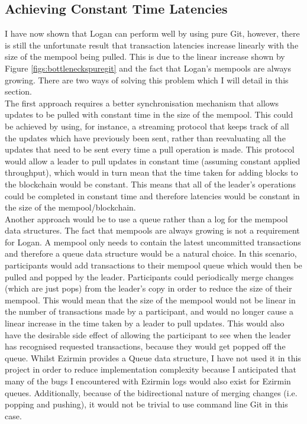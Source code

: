 \documentclass[12pt,a4paper,twoside,openright]{report}
\begin{document}
	\subsection{Achieving Constant Time Latencies}\label{sect:bettersync}
	I have now shown that Logan can perform well by using pure Git, however, there is still the unfortunate result that transaction latencies increase linearly with the size of the mempool being pulled.
	This is due to the linear increase shown by Figure \ref{figs:bottleneckspuregit} and the fact that Logan's mempools are always growing. 
	There are two ways of solving this problem which I will detail in this section.\\

	The first approach requires a better synchronisation mechanism that allows updates to be pulled with constant time in the size of the mempool.
	This could be achieved by using, for instance, a streaming protocol that keeps track of all the updates which have previously been sent, rather than reevaluating all the updates that need to be sent every time a pull operation is made. 
	This protocol would allow a leader to pull updates in constant time (assuming constant applied throughput), which would in turn mean that the time taken for adding blocks to the blockchain would be constant.
	This means that all of the leader's operations could be completed in constant time and therefore latencies would be constant in the size of the mempool/blockchain. \\

	Another approach would be to use a queue rather than a log for the mempool data structures. 
	The fact that mempools are always growing is not a requirement for Logan.
	A mempool only needs to contain the latest uncommitted transactions and therefore a queue data structure would be a natural choice.
	In this scenario, participants would add transactions to their mempool queue which would then be pulled and popped by the leader.
	Participants could periodically merge changes (which are just pops) from the leader's copy in order to reduce the size of their mempool.
	This would mean that the size of the mempool would not be linear in the number of transactions made by a participant, and would no longer cause a linear increase in the time taken by a leader to pull updates.
	This would also have the desirable side effect of allowing the participant to see when the leader has recognised requested transactions, because they would get popped off the queue. 
	Whilst Ezirmin provides a Queue data structure, I have not used it in this project in order to reduce implementation complexity because I anticipated that many of the bugs I encountered with Ezirmin logs would also exist for Ezirmin queues.
	Additionally, because of the bidirectional nature of merging changes (i.e. popping and pushing), it would not be trivial to use command line Git in this case. \\
\end{document}
